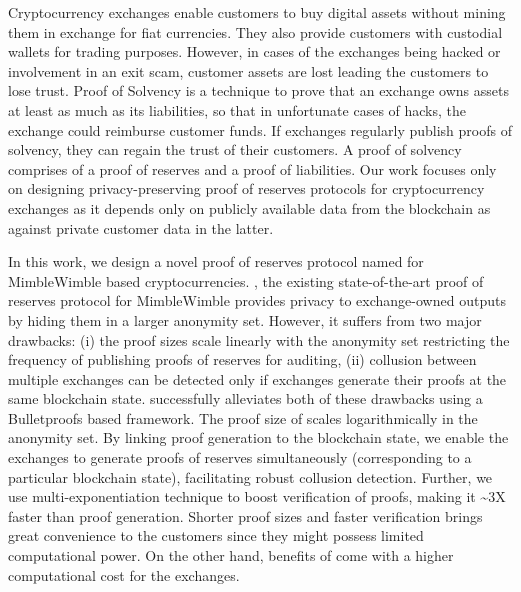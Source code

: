 \begin{Abstract}

Cryptocurrency exchanges enable customers to buy digital assets without mining them in exchange for fiat currencies.
They also provide customers with custodial wallets for trading purposes. 
However, in cases of the exchanges being hacked or involvement in an exit scam, customer assets are lost leading the customers to lose trust.
Proof of Solvency is a technique to prove that an exchange owns assets at least as much as its liabilities, so that in unfortunate cases of hacks, the exchange could reimburse customer funds.
If exchanges regularly publish proofs of solvency, they can regain the trust of their customers.
A proof of solvency comprises of a proof of reserves and a proof of liabilities.
Our work focuses only on designing privacy-preserving proof of reserves protocols for cryptocurrency exchanges as it depends only on publicly available data from the blockchain as against private customer data in the latter.

In this work, we design a novel proof of reserves protocol named \RB for MimbleWimble based cryptocurrencies.
\R \cite{Dutta2019b}, the existing state-of-the-art proof of reserves protocol for MimbleWimble provides privacy to exchange-owned outputs by hiding them in a larger anonymity set.
However, it suffers from two major drawbacks:
(i) the \R proof sizes scale linearly with the anonymity set restricting the frequency of publishing proofs of reserves for auditing,
(ii) collusion between multiple exchanges can be detected only if exchanges generate their proofs at the same blockchain state.
\RB successfully alleviates both of these drawbacks using a Bulletproofs \cite{Bunz2018} based framework.
The proof size of \RB scales logarithmically in the anonymity set.
By linking \RB proof generation to the blockchain state, we enable the exchanges to generate proofs of reserves simultaneously (corresponding to a particular blockchain state), facilitating robust collusion detection.
Further, we use multi-exponentiation technique to boost verification of \RB proofs, making it \textasciitilde3X faster than proof generation.
Shorter proof sizes and faster verification brings great convenience to the customers since they might possess limited computational power.
On the other hand, benefits of \RB come with a higher computational cost for the exchanges.    


\end{Abstract}
